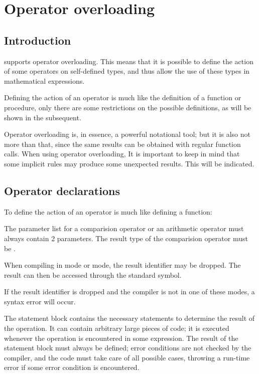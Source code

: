 \chapter{Operator overloading}
\label{ch:operatoroverloading}
\section{Introduction}
\fpc supports operator overloading. This means that it is possible to
define the action of some operators on self-defined types, and thus allow
the use of these types in mathematical expressions.

Defining the action of an operator is much like the definition of a
function or procedure, only there are some restrictions on the possible
definitions, as will be shown in the subsequent.

Operator overloading is, in essence, a powerful notational tool;
but it is also not more than that, since the same results can be
obtained with regular function calls. When using operator overloading,
It is important to keep in mind that some implicit rules may produce
some unexpected results. This will be indicated.

\section{Operator declarations}
To define the action of an operator is much like defining a function:

The parameter list for a comparision operator or an arithmetic operator
must always contain 2 parameters. The result type of the comparision
operator must be .

\begin{remark}
When compiling in  mode or  mode, the result
identifier may be dropped. The result can then be accessed through
the standard  symbol.

If the result identifier is dropped and the compiler is not in one
of these modes, a syntax error will occur.
\end{remark}

The statement block contains the necessary statements to determine the
result of the operation. It can contain arbitrary large pieces of code;
it is executed whenever the operation is encountered in some expression.
The result of the statement block must always be defined; error conditions
are not checked by the compiler, and the code must take care of all possible
cases, throwing a run-time error if some error condition is encountered.

